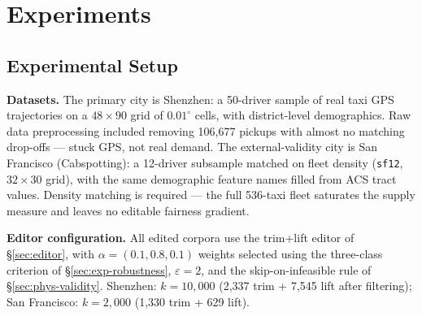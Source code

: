 \section{Experiments}\label{sec:experiments}

\subsection{Experimental Setup}\label{sec:exp-setup}
\textbf{Datasets.} The primary city is Shenzhen: a 50-driver sample of real
taxi GPS trajectories on a $48{\times}90$ grid of $0.01^{\circ}$ cells, with
district-level demographics. Raw data preprocessing included removing 106{,}677
pickups with almost no matching drop-offs --- stuck GPS, not real demand.
The external-validity city is San Francisco (Cabspotting): a 12-driver
subsample matched on fleet density (\texttt{sf12}, $32{\times}30$ grid), with
the same demographic feature names filled from ACS tract values. Density matching is
required --- the full 536-taxi fleet saturates the supply measure and leaves
no editable fairness gradient.


\textbf{Editor configuration.} All edited corpora use the trim+lift editor of
\S\ref{sec:editor}, with $\alpha = (0.1, 0.8, 0.1)$ weights selected using the 
three-class criterion of \S\ref{sec:exp-robustness}, $\varepsilon = 2$, and the 
skip-on-infeasible rule of \S\ref{sec:phys-validity}. Shenzhen: 
$k = 10{,}000$ (2{,}337 trim + 7{,}545 lift after filtering); San Francisco: 
$k = 2{,}000$ (1{,}330 trim + 629 lift).

